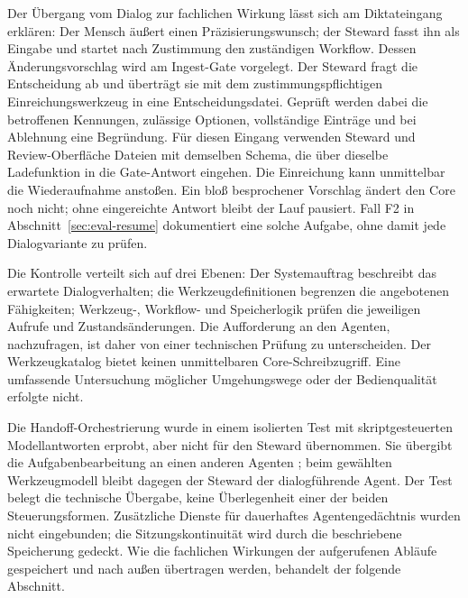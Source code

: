 Der Übergang vom Dialog zur fachlichen Wirkung lässt sich am
Diktateingang erklären: Der Mensch äußert einen Präzisierungswunsch;
der Steward fasst ihn als Eingabe und startet nach Zustimmung den
zuständigen Workflow. Dessen Änderungsvorschlag wird am Ingest-Gate
vorgelegt. Der Steward fragt die Entscheidung ab und überträgt sie mit
dem zustimmungspflichtigen Einreichungswerkzeug in eine
Entscheidungsdatei. Geprüft werden dabei die betroffenen Kennungen,
zulässige Optionen, vollständige Einträge und bei Ablehnung eine
Begründung. Für diesen Eingang verwenden Steward und Review-Oberfläche
Dateien mit demselben Schema, die über dieselbe Ladefunktion in die
Gate-Antwort eingehen. Die Einreichung kann unmittelbar die
Wiederaufnahme anstoßen. Ein bloß besprochener Vorschlag ändert den
Core noch nicht; ohne eingereichte Antwort bleibt der Lauf pausiert.
Fall F2 in Abschnitt~\ref{sec:eval-resume} dokumentiert eine solche
Aufgabe, ohne damit jede Dialogvariante zu prüfen.

Die Kontrolle verteilt sich auf drei Ebenen: Der Systemauftrag
beschreibt das erwartete Dialogverhalten; die Werkzeugdefinitionen
begrenzen die angebotenen Fähigkeiten; Werkzeug-, Workflow- und
Speicherlogik prüfen die jeweiligen Aufrufe und Zustandsänderungen.
Die Aufforderung an den Agenten, nachzufragen, ist daher von einer
technischen Prüfung zu unterscheiden. Der Werkzeugkatalog bietet
keinen unmittelbaren Core-Schreibzugriff. Eine umfassende Untersuchung
möglicher Umgehungswege oder der Bedienqualität erfolgte nicht.

Die Handoff-Orchestrierung wurde in einem isolierten Test mit
skriptgesteuerten Modellantworten erprobt, aber nicht für den Steward
übernommen. Sie übergibt die Aufgabenbearbeitung an einen anderen
Agenten \cite{msmaf2026handoff}; beim gewählten Werkzeugmodell bleibt dagegen
der Steward der dialogführende Agent. Der Test belegt die technische
Übergabe, keine Überlegenheit einer der beiden Steuerungsformen.
Zusätzliche Dienste für dauerhaftes Agentengedächtnis wurden nicht
eingebunden; die Sitzungskontinuität wird durch die beschriebene
Speicherung gedeckt. Wie die fachlichen Wirkungen der aufgerufenen
Abläufe gespeichert und nach außen übertragen werden, behandelt der
folgende Abschnitt.
